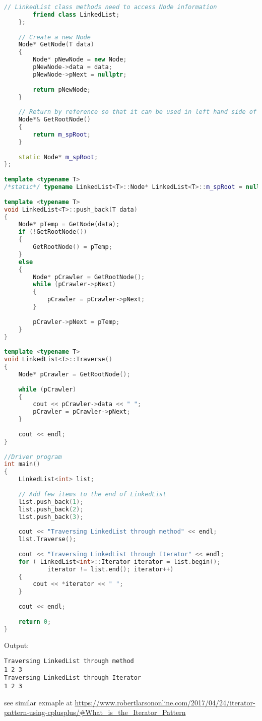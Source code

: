\documentclass{book}
\begin{document}
\begin{lstlisting}[caption={Iterator Pattern Example 3 Signly linked list with interator},language=C++]
        // LinkedList class methods need to access Node information 
        friend class LinkedList; 
    }; 
  
    // Create a new Node 
    Node* GetNode(T data) 
    { 
        Node* pNewNode = new Node; 
        pNewNode->data = data; 
        pNewNode->pNext = nullptr; 
  
        return pNewNode; 
    } 
  
    // Return by reference so that it can be used in left hand side of the assignment expression 
    Node*& GetRootNode() 
    { 
        return m_spRoot; 
    } 
  
    static Node* m_spRoot; 
}; 
  
template <typename T> 
/*static*/ typename LinkedList<T>::Node* LinkedList<T>::m_spRoot = nullptr; 
  
template <typename T> 
void LinkedList<T>::push_back(T data) 
{ 
    Node* pTemp = GetNode(data); 
    if (!GetRootNode()) 
    { 
        GetRootNode() = pTemp; 
    } 
    else
    { 
        Node* pCrawler = GetRootNode(); 
        while (pCrawler->pNext) 
        { 
            pCrawler = pCrawler->pNext; 
        } 
  
        pCrawler->pNext = pTemp; 
    } 
} 
  
template <typename T> 
void LinkedList<T>::Traverse() 
{ 
    Node* pCrawler = GetRootNode(); 
  
    while (pCrawler) 
    { 
        cout << pCrawler->data << " "; 
        pCrawler = pCrawler->pNext; 
    } 
  
    cout << endl; 
} 
  
//Driver program 
int main() 
{ 
    LinkedList<int> list; 
  
    // Add few items to the end of LinkedList 
    list.push_back(1); 
    list.push_back(2); 
    list.push_back(3); 
  
    cout << "Traversing LinkedList through method" << endl; 
    list.Traverse(); 
  
    cout << "Traversing LinkedList through Iterator" << endl; 
    for ( LinkedList<int>::Iterator iterator = list.begin(); 
            iterator != list.end(); iterator++) 
    { 
        cout << *iterator << " "; 
    } 
  
    cout << endl; 
  
    return 0; 
} 
\end{lstlisting}

Output:
\begin{Verbatim}
Traversing LinkedList through method
1 2 3 
Traversing LinkedList through Iterator
1 2 3 
\end{Verbatim}
see similar exmaple at \url{https://www.robertlarsononline.com/2017/04/24/iterator-pattern-using-cplusplus/#What_is_the_Iterator_Pattern}
\end{document}
